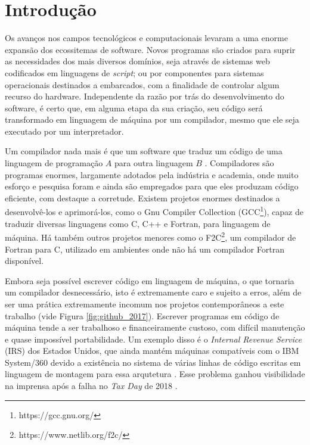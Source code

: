 \chapter{Introdução}
\label{cap:introducao}

Os avanços nos campos tecnológicos e computacionais levaram a uma enorme
expansão dos ecossitemas de software.%
Novos programas são criados para
suprir as necessidades dos mais diversos domínios, seja através de sistemas web
codificados em linguagens de \textit{script}; ou por componentes para
sistemas operacionais destinados a embarcados, com a finalidade de controlar algum
recurso do hardware. Independente da razão por trás do desenvolvimento
do software, é certo que, em alguma etapa da sua criação, seu código será transformado em linguagem
de máquina por um compilador, mesmo que ele seja executado por um
interpretador.

Um compilador nada mais é que um software que traduz um código de uma linguagem
de programação $A$ para outra linguagem $B$ \citep{dragonbook}. Compiladores
são programas enormes, largamente adotados pela indústria e academia, onde muito
esforço e pesquisa foram e ainda são empregados para que eles produzam código
eficiente, com destaque a corretude. Existem projetos enormes destinados a desenvolvê-los e
aprimorá-los, como o Gnu Compiler Collection
(GCC\footnote{https://gcc.gnu.org/}), capaz de traduzir diversas linguagens
como C, C++ e Fortran, para linguagem de máquina. Há também outros projetos
menores como o F2C\footnote{https://www.netlib.org/f2c/}, um compilador de
Fortran para C, utilizado em ambientes onde não há um compilador Fortran
disponível.

Embora seja possível escrever código em linguagem de máquina, o que
tornaria um compilador desnecessário, isto é extremamente caro e
sujeito a erros, além de ser uma prática extremamente
incomum nos projetos contemporâneos a este trabalho \citep{githuboctoverse} (vide
Figura \ref{fig:github_2017}). Escrever programas em código de máquina tende a
ser trabalhoso e financeiramente custoso, com difícil manutenção e quase impossível portabilidade.
Um exemplo disso é o \textit{Internal Revenue Service} (IRS) dos Estados Unidos,
que ainda mantém máquinas compatíveis com o IBM System/360 devido a existência no sistema de
várias linhas de código escritas em linguagem de montagem para essa
arqutetura \citep{gao}. Esse problema ganhou visibilidade na imprensa após a falha no
\textit{Tax Day} de 2018 \citep{tax_failure}.

